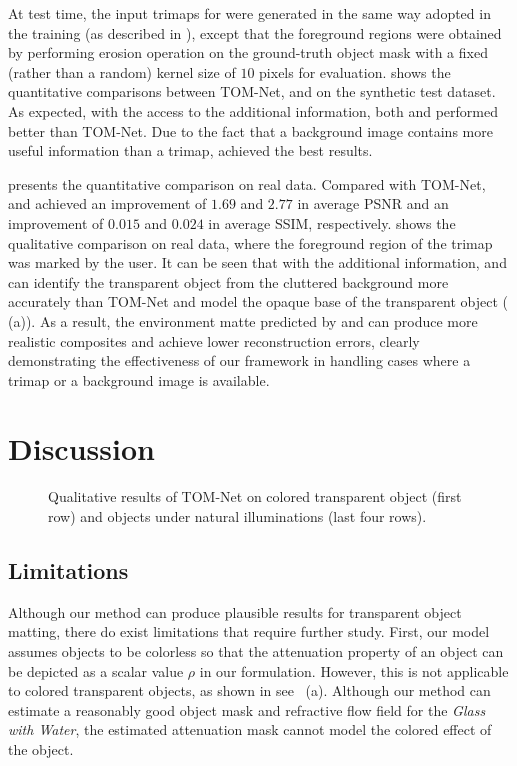 At test time, the input trimaps for \TOMNetTrimap were generated in the same way adopted in the training (as described in ), except that the foreground regions were obtained by performing erosion operation on the ground-truth object mask with a fixed (rather than a random) kernel size of $10$ pixels for evaluation.
 shows the quantitative comparisons between TOM-Net, \TOMNetTrimap and \TOMNetBg on the synthetic test dataset. 
As expected, with the access to the additional information, both \TOMNetTrimap and \TOMNetBg performed better than TOM-Net. Due to the fact that a background image contains more useful information than a trimap, \TOMNetBg achieved the best results.

 presents the quantitative comparison on real data. Compared with TOM-Net, \TOMNetTrimap and \TOMNetBg achieved an improvement of $1.69$ and $2.77$ in average PSNR and an improvement of $0.015$ and $0.024$ in average SSIM, respectively. 
 shows the qualitative comparison on real data, where the foreground region of the trimap was marked by the user. It can be seen that with the additional information, \TOMNetTrimap and \TOMNetBg can identify the transparent object from the cluttered background more accurately than TOM-Net and model the opaque base of the transparent object ( (a)). As a result, the environment matte predicted by \TOMNetTrimap and \TOMNetBg can produce more realistic composites and achieve lower reconstruction errors, clearly demonstrating the effectiveness of our framework in handling cases where a trimap or a background image is available.

\section{Discussion}
\label{sec:discussion}

\begin{figure}[t] \centering
    
    \caption[Results on colored object and objects under natural illumination]{Qualitative results of TOM-Net on colored transparent object (first row) and objects under natural illuminations (last four rows).}
    \label{fig:limitation}
\end{figure}

\subsection{Limitations}
Although our method can produce plausible results for transparent object matting, there do exist limitations that require further study.
First, our model assumes objects to be colorless so that the attenuation property of an object can be depicted as a scalar value $\rho$ in our formulation. However, this is not applicable to colored transparent objects, as shown in see ~(a). 
Although our method can estimate a reasonably good object mask and refractive flow field for the \emph{Glass with Water}, the estimated attenuation mask cannot model the colored effect of the object.

